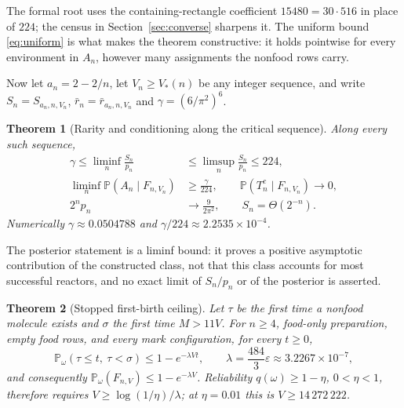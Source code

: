 \documentclass[11pt,letterpaper]{article}
\theoremstyle{plain}
\newtheorem{theorem}{Theorem}[section]
\theoremstyle{definition}
\theoremstyle{remark}
\numberwithin{equation}{section}
\newcommand{\PP}{\mathbb P}
\newcommand{\eps}{\varepsilon}
\begin{document}
The formal root uses the containing-rectangle coefficient $15480=30\cdot516$ in place of $224$; the census in Section~\ref{sec:converse} sharpens it. The uniform bound \eqref{eq:uniform} is what makes the theorem constructive: it holds pointwise for every environment in $A_n$, however many assignments the nonfood rows carry.

Now let $a_n=2-2/n$, let $V_n\ge V_*(n)$ be any integer sequence, and write $S_n=S_{a_n,n,V_n}$, $\bar r_n=\bar r_{a_n,n,V_n}$ and $\gamma=(6/\pi^2)^6$.

\begin{theorem}[Rarity and conditioning along the critical sequence]\label{thm:limits}
Along every such sequence,
\begin{align}
 \gamma\le\liminf_n\frac{S_n}{p_n}&\le\limsup_n\frac{S_n}{p_n}\le224,\label{eq:limbounds}\\
 \liminf_n\PP(A_n\mid F_{n,V_n})&\ge\frac\gamma{224},\qquad \PP(T_n^c\mid F_{n,V_n})\to0,\label{eq:posterior}\\
 2^np_n&\to\frac9{2\pi^2},\qquad S_n=\Theta(2^{-n}).\label{eq:rarity}
\end{align}
Numerically $\gamma\approx0.0504788$ and $\gamma/224\approx2.2535\times10^{-4}$.
\end{theorem}

The posterior statement is a liminf bound: it proves a positive asymptotic contribution of the constructed class, not that this class accounts for most successful reactors, and no exact limit of $S_n/p_n$ or of the posterior is asserted.

\begin{theorem}[Stopped first-birth ceiling]\label{thm:birth}
Let $\tau$ be the first time a nonfood molecule exists and $\sigma$ the first time $M>11V$. For $n\ge4$, food-only preparation, empty food rows, and every mark configuration, for every $t\ge0$,
\begin{equation}\label{eq:birth}
 \PP_\omega(\tau\le t,\ \tau<\sigma)\le1-e^{-\lambda Vt},\qquad\lambda=\frac{484}3\eps\approx3.2267\times10^{-7},
\end{equation}
and consequently $\PP_\omega(F_{n,V})\le1-e^{-\lambda V}$. Reliability $q(\omega)\ge1-\eta$, $0<\eta<1$, therefore requires $V\ge\log(1/\eta)/\lambda$; at $\eta=0.01$ this is $V\ge14\,272\,222$.
\end{theorem}
\end{document}
